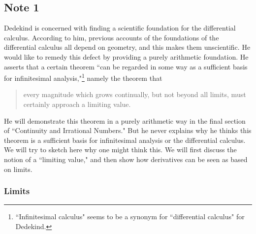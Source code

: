 \documentclass[twoside,openright]{article}
\begin{document}
\subsection*{Note 1}\label{note1}

Dedekind is concerned with finding a scientific foundation for the
differential calculus.  According to him, previous accounts of the
foundations of the differential calculus all depend on geometry, and
this makes them unscientific.  He would like to remedy this defect by
providing a purely arithmetic foundation.  He asserts that a certain
theorem ``can be regarded in some way as a sufficient basis for
infinitesimal analysis,"\footnote{``Infinitesimal calculus" seems to
  be a synonym for ``differential calculus" for Dedekind.} namely the
theorem that
\begin{quote}
  every magnitude which grows continually, but not beyond all limits,
  must certainly approach a limiting value.
\end{quote}
He will demonstrate this theorem in a purely arithmetic way in the
final section of ``Continuity and Irrational Numbers."  But he never
explains why he thinks this theorem is a sufficient basis for
infinitesimal analysis or the differential calculus.  We will try to
sketch here why one might think this.  We will first discuss the
notion of a ``limiting value," and then show how derivatives can be
seen as based on limits.

\subsubsection*{Limits}
\end{document}
